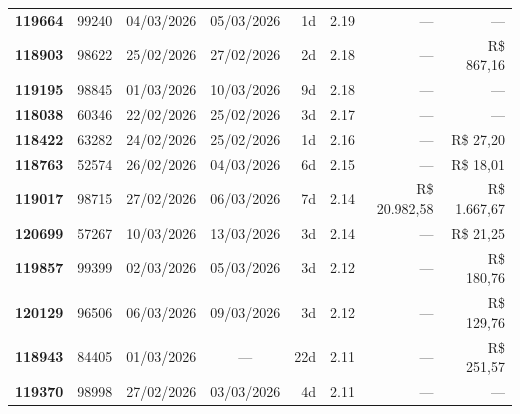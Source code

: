 \documentclass[a4paper,10pt]{article}
\begin{document}
\begin{center}
\begin{longtable}{>{\scriptsize}r>{\scriptsize}r>{\scriptsize}c>{\scriptsize}c>{\scriptsize}r>{\scriptsize}r>{\scriptsize}r>{\scriptsize}r}
\textcolor{anomyellow}{\textbf{119664}} & 99240 & 04/03/2026 & 05/03/2026 & 1d & \textcolor{anomyellow}{2.19} & --- & --- \\

\textcolor{anomyellow}{\textbf{118903}} & 98622 & 25/02/2026 & 27/02/2026 & 2d & \textcolor{anomyellow}{2.18} & --- & \textcolor{anomred}{R\$ 867,16} \\

\textcolor{anomyellow}{\textbf{119195}} & 98845 & 01/03/2026 & 10/03/2026 & 9d & \textcolor{anomyellow}{2.18} & --- & --- \\

\textcolor{anomyellow}{\textbf{118038}} & 60346 & 22/02/2026 & 25/02/2026 & 3d & \textcolor{anomyellow}{2.17} & --- & --- \\

\textcolor{anomyellow}{\textbf{118422}} & 63282 & 24/02/2026 & 25/02/2026 & 1d & \textcolor{anomyellow}{2.16} & --- & \textcolor{anomred}{R\$ 27,20} \\

\textcolor{anomyellow}{\textbf{118763}} & 52574 & 26/02/2026 & 04/03/2026 & 6d & \textcolor{anomyellow}{2.15} & --- & \textcolor{anomred}{R\$ 18,01} \\

\textcolor{anomyellow}{\textbf{119017}} & 98715 & 27/02/2026 & 06/03/2026 & 7d & \textcolor{anomyellow}{2.14} & R\$ 20.982,58 & \textcolor{anomred}{R\$ 1.667,67} \\

\textcolor{anomyellow}{\textbf{120699}} & 57267 & 10/03/2026 & 13/03/2026 & 3d & \textcolor{anomyellow}{2.14} & --- & \textcolor{anomred}{R\$ 21,25} \\

\textcolor{anomyellow}{\textbf{119857}} & 99399 & 02/03/2026 & 05/03/2026 & 3d & \textcolor{anomyellow}{2.12} & --- & \textcolor{anomred}{R\$ 180,76} \\

\textcolor{anomyellow}{\textbf{120129}} & 96506 & 06/03/2026 & 09/03/2026 & 3d & \textcolor{anomyellow}{2.12} & --- & \textcolor{anomred}{R\$ 129,76} \\

\textcolor{anomyellow}{\textbf{118943}} & 84405 & 01/03/2026 & — & 22d & \textcolor{anomyellow}{2.11} & --- & \textcolor{anomred}{R\$ 251,57} \\

\textcolor{anomyellow}{\textbf{119370}} & 98998 & 27/02/2026 & 03/03/2026 & 4d & \textcolor{anomyellow}{2.11} & --- & --- \\


\end{longtable}
\end{center}
\end{document}
